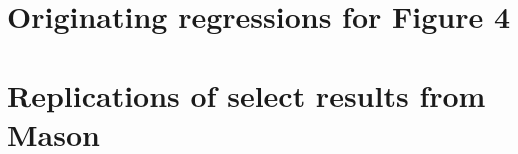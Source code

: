 \documentclass[10pt,landscape]{article}
\begin{document}
\section{Originating regressions for Figure 4}

\clearpage

\clearpage

\clearpage

\clearpage

\section{Replications of select results from Mason}


\clearpage


\clearpage

\clearpage


% 

% 

% 

% 

% 

% 

% 

% 

% 

% 

% 

% 

% 

% 

% 

% 
\end{document}
